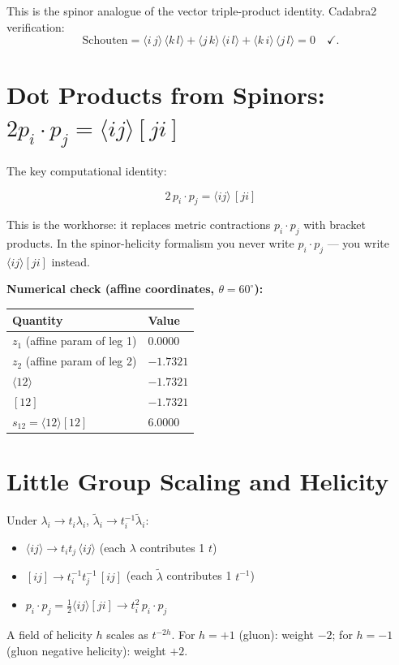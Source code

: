 \documentclass[12pt]{article}
\newcommand{\abra}[2]{\langle #1\, #2 \rangle}
\begin{document}
This is the spinor analogue of the vector triple-product identity.
Cadabra2 verification:
\begin{equation}
\mathrm{Schouten} = \abra{i}{j}\,\abra{k}{l} + \abra{j}{k}\,\abra{i}{l} + \abra{k}{i}\,\abra{j}{l} = 0 \quad\checkmark .
\end{equation}

\section{Dot Products from Spinors:
$2p_i\cdot p_j = \langle ij\rangle[ji]$}\label{sec:dot_products}

The key computational identity:

\begin{mdframed}[backgroundcolor=green!5]
\begin{equation}
\boxed{2\,p_i\cdot p_j = \langle ij\rangle\,[ji]}
\tag{50.17}
\end{equation}
\end{mdframed}

This is the workhorse: it replaces metric contractions $p_i\cdot p_j$ with
bracket products.  In the spinor-helicity formalism you never write
$p_i\cdot p_j$ --- you write $\langle ij\rangle[ji]$ instead.

\textbf{Numerical check (affine coordinates, $\theta=60^\circ$):}
\begin{center}
\begin{tabular}{|l|l|}
\hline
Quantity & Value \\
\hline
$z_1$ (affine param of leg 1) & $0.0000$ \\
$z_2$ (affine param of leg 2) & $-1.7321$ \\
$\langle 12\rangle$ & $-1.7321$ \\
$[12]$ & $-1.7321$ \\
$s_{12}=\langle12\rangle[12]$ & $6.0000$ \\
\hline
\end{tabular}
\end{center}

\section{Little Group Scaling and Helicity}\label{sec:helicity}

Under $\lambda_i\to t_i\lambda_i$, $\tilde\lambda_i\to t_i^{-1}\tilde\lambda_i$:
\begin{itemize}
\item $\langle ij\rangle\to t_i t_j\,\langle ij\rangle$ (each $\lambda$ contributes 1 $t$)
\item $[ij]\to t_i^{-1}t_j^{-1}\,[ij]$ (each $\tilde\lambda$ contributes 1 $t^{-1}$)
\item $p_i\cdot p_j = \tfrac12\langle ij\rangle[ji]\to t_i^2\,p_i\cdot p_j$
\end{itemize}
A field of helicity $h$ scales as $t^{-2h}$.  For $h=+1$ (gluon): weight $-2$;
for $h=-1$ (gluon negative helicity): weight $+2$.
\end{document}

